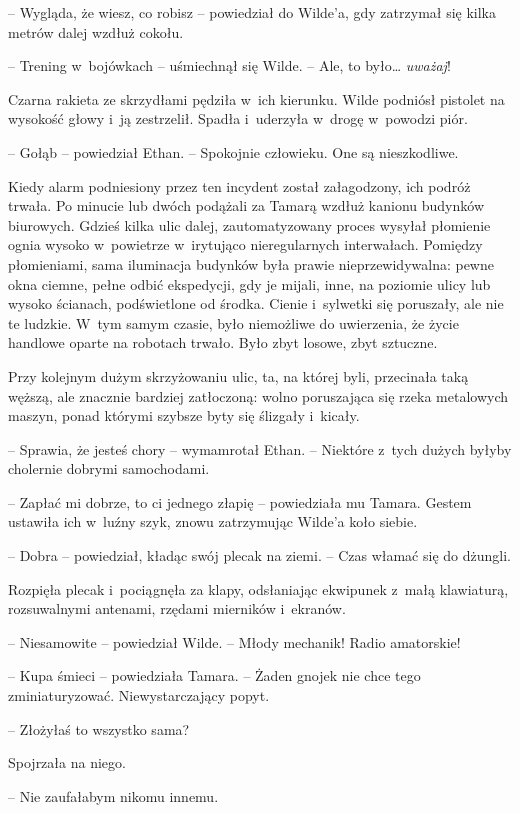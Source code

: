 \documentclass[oneside,polish,11pt,sfheadings]{mwbk}
\begin{document}
-- Wygląda, że wiesz, co robisz -- powiedział do Wilde'a, gdy zatrzymał
się kilka metrów dalej wzdłuż cokołu.

-- Trening w~bojówkach -- uśmiechnął się Wilde. -- Ale, to było\ldots
\emph{uważaj}!

Czarna rakieta ze skrzydłami pędziła w~ich kierunku. Wilde podniósł
pistolet na wysokość głowy i~ją zestrzelił. Spadła i~uderzyła w~drogę w~powodzi piór.

-- Gołąb -- powiedział Ethan. -- Spokojnie człowieku. One są nieszkodliwe.

Kiedy alarm podniesiony przez ten incydent został załagodzony, ich
podróż trwała. Po minucie lub dwóch podążali za Tamarą wzdłuż kanionu
budynków biurowych. Gdzieś kilka ulic dalej, zautomatyzowany proces
wysyłał płomienie ognia wysoko w~powietrze w~irytująco nieregularnych
interwałach. Pomiędzy płomieniami, sama iluminacja budynków była prawie
nieprzewidywalna: pewne okna ciemne, pełne odbić ekspedycji, gdy je
mijali, inne, na poziomie ulicy lub wysoko ścianach, podświetlone od
środka. Cienie i~sylwetki się poruszały, ale nie te ludzkie. W~tym samym
czasie, było niemożliwe do uwierzenia, że życie handlowe oparte na
robotach trwało. Było zbyt losowe, zbyt sztuczne.

Przy kolejnym dużym skrzyżowaniu ulic, ta, na której byli, przecinała
taką węższą, ale znacznie bardziej zatłoczoną: wolno poruszająca się
rzeka metalowych maszyn, ponad którymi szybsze byty się ślizgały i~kicały.

-- Sprawia, że jesteś chory -- wymamrotał Ethan. -- Niektóre z~tych dużych
byłyby cholernie dobrymi samochodami.

-- Zapłać mi dobrze, to ci jednego złapię -- powiedziała mu Tamara. Gestem
ustawiła ich w~luźny szyk, znowu zatrzymując Wilde'a koło siebie.

-- Dobra -- powiedział, kładąc swój plecak na ziemi. -- Czas włamać się do
dżungli.

Rozpięła plecak i~pociągnęła za klapy, odsłaniając ekwipunek z~małą
klawiaturą, rozsuwalnymi antenami, rzędami mierników i~ekranów.

-- Niesamowite -- powiedział Wilde. -- Młody mechanik! Radio amatorskie!

-- Kupa śmieci -- powiedziała Tamara. -- Żaden gnojek nie chce tego
zminiaturyzować. Niewystarczający popyt.

-- Złożyłaś to wszystko sama?

Spojrzała na niego. 

-- Nie zaufałabym nikomu innemu.
\end{document}
